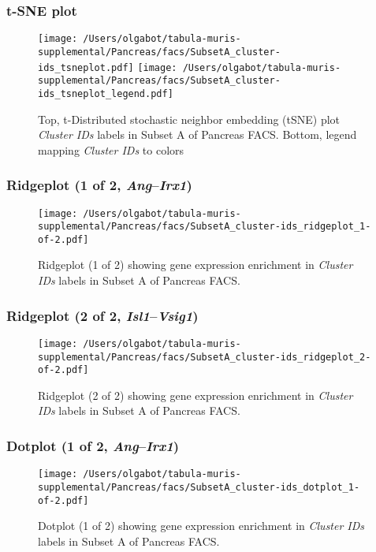 \clearpage
\subsubsection{t-SNE plot}
\begin{figure}[h]
\centering
\texttt{[image: /Users/olgabot/tabula-muris-supplemental/Pancreas/facs/SubsetA\_cluster-ids\_tsneplot.pdf]}
\texttt{[image: /Users/olgabot/tabula-muris-supplemental/Pancreas/facs/SubsetA\_cluster-ids\_tsneplot\_legend.pdf]}
\caption{Top, t-Distributed stochastic neighbor embedding (tSNE) plot  \emph{Cluster IDs} labels in Subset A of Pancreas FACS. Bottom, legend mapping \emph{Cluster IDs} to colors}
\end{figure}


\clearpage

\subsubsection{Ridgeplot (1 of 2, \emph{Ang}--\emph{Irx1})}
\begin{figure}[h]
\centering
\texttt{[image: /Users/olgabot/tabula-muris-supplemental/Pancreas/facs/SubsetA\_cluster-ids\_ridgeplot\_1-of-2.pdf]}

\caption{ Ridgeplot (1 of 2)  showing gene expression enrichment in \emph{Cluster IDs} labels in Subset A of Pancreas FACS. }
\end{figure}


\clearpage

\subsubsection{Ridgeplot (2 of 2, \emph{Isl1}--\emph{Vsig1})}
\begin{figure}[h]
\centering
\texttt{[image: /Users/olgabot/tabula-muris-supplemental/Pancreas/facs/SubsetA\_cluster-ids\_ridgeplot\_2-of-2.pdf]}

\caption{ Ridgeplot (2 of 2)  showing gene expression enrichment in \emph{Cluster IDs} labels in Subset A of Pancreas FACS. }
\end{figure}


\clearpage

\subsubsection{Dotplot (1 of 2, \emph{Ang}--\emph{Irx1})}
\begin{figure}[h]
\centering
\texttt{[image: /Users/olgabot/tabula-muris-supplemental/Pancreas/facs/SubsetA\_cluster-ids\_dotplot\_1-of-2.pdf]}

\caption{ Dotplot (1 of 2)  showing gene expression enrichment in \emph{Cluster IDs} labels in Subset A of Pancreas FACS. }
\end{figure}


